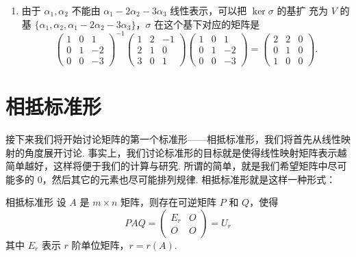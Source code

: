 \begin{solution}
\begin{enumerate}
        \item 由于 $\alpha_{1}, \alpha_{2}$ 不能由 $\alpha_{1}-2 \alpha_{2}-3 \alpha_{3}$ 线性表示，可以把 $\ker \sigma$ 的基扩 充为 $V$ 的基 $\{\alpha_{1}, \alpha_{2}, \alpha_{1}-2 \alpha_{2}-3 \alpha_{3}\}$，$\sigma$ 在这个基下对应的矩阵是
              \[\begin{pmatrix}
                      1 & 0 & 1  \\
                      0 & 1 & -2 \\
                      0 & 0 & -3
                  \end{pmatrix}^{-1}\begin{pmatrix}
                      1 & 2 & -1 \\
                      2 & 1 & 0  \\
                      3 & 0 & 1
                  \end{pmatrix}\begin{pmatrix}
                      1 & 0 & 1  \\
                      0 & 1 & -2 \\
                      0 & 0 & -3
                  \end{pmatrix}=\begin{pmatrix}
                      2 & 2 & 0 \\
                      0 & 1 & 0 \\
                      1 & 0 & 0
                  \end{pmatrix}.\]
    \end{enumerate}
\end{solution}

\section{相抵标准形}

接下来我们将开始讨论矩阵的第一个标准形——相抵标准形，我们将首先从线性映射的角度展开讨论. 事实上，我们讨论标准形的目标就是使得线性映射矩阵表示越简单越好，这样将便于我们的计算与研究. 所谓的简单，就是我们希望矩阵中尽可能多的 $0$，然后其它的元素也尽可能排列规律. 相抵标准形就是这样一种形式：

\begin{theorem}{}{相抵标准形}
    设 $A$ 是 $m\times n$ 矩阵，则存在可逆矩阵 $P$ 和 $Q$，使得
    \[PAQ = \begin{pmatrix}
            E_r & O \\ O & O
        \end{pmatrix} = U_r\]
    其中 $E_r$ 表示 $r$ 阶单位矩阵，$r = r(A)$.
\end{theorem}

